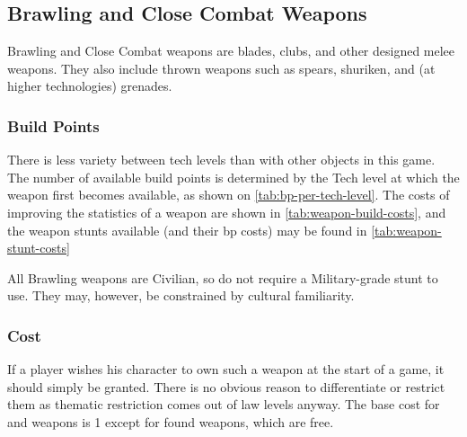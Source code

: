 \subsection{Brawling and Close Combat Weapons}
\label{sec:brawling-and-close-combat-weapons}

Brawling and Close Combat weapons are blades, clubs, and other designed melee weapons. They also include thrown weapons such as spears, shuriken, and (at higher technologies) grenades.

\subsubsection{Build Points}

There is less variety between tech levels than with other objects in this game. The number of available build points is determined by the Tech level at which the weapon first becomes available, as shown on \autoref{tab:bp-per-tech-level}. The costs of improving the statistics of a weapon are shown in \autoref{tab:weapon-build-costs}, and the weapon stunts available (and their bp costs) may be found in \autoref{tab:weapon-stunt-costs}

% 

% 

All Brawling weapons are Civilian, so do not require a Military-grade stunt to use. They may, however, be constrained by cultural familiarity.

\subsubsection{Cost}

If a player wishes his character to own such a weapon at the start of a game, it should simply be granted. There is no obvious reason to differentiate or restrict them as thematic restriction comes out of law levels anyway. The base cost for  and  weapons is 1 except for found weapons, which are free.

